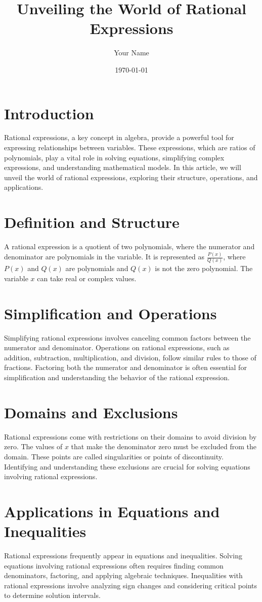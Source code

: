\documentclass{article}
\title{Unveiling the World of Rational Expressions}
\author{Your Name}
\date{\today}
\begin{document}
\maketitle

\section*{Introduction}
Rational expressions, a key concept in algebra, provide a powerful tool for expressing relationships between variables. These expressions, which are ratios of polynomials, play a vital role in solving equations, simplifying complex expressions, and understanding mathematical models. In this article, we will unveil the world of rational expressions, exploring their structure, operations, and applications.

\section*{Definition and Structure}
A rational expression is a quotient of two polynomials, where the numerator and denominator are polynomials in the variable. It is represented as $\frac{P(x)}{Q(x)}$, where $P(x)$ and $Q(x)$ are polynomials and $Q(x)$ is not the zero polynomial. The variable $x$ can take real or complex values.

\section*{Simplification and Operations}
Simplifying rational expressions involves canceling common factors between the numerator and denominator. Operations on rational expressions, such as addition, subtraction, multiplication, and division, follow similar rules to those of fractions. Factoring both the numerator and denominator is often essential for simplification and understanding the behavior of the rational expression.

\section*{Domains and Exclusions}
Rational expressions come with restrictions on their domains to avoid division by zero. The values of $x$ that make the denominator zero must be excluded from the domain. These points are called singularities or points of discontinuity. Identifying and understanding these exclusions are crucial for solving equations involving rational expressions.

\section*{Applications in Equations and Inequalities}
Rational expressions frequently appear in equations and inequalities. Solving equations involving rational expressions often requires finding common denominators, factoring, and applying algebraic techniques. Inequalities with rational expressions involve analyzing sign changes and considering critical points to determine solution intervals.
\end{document}
